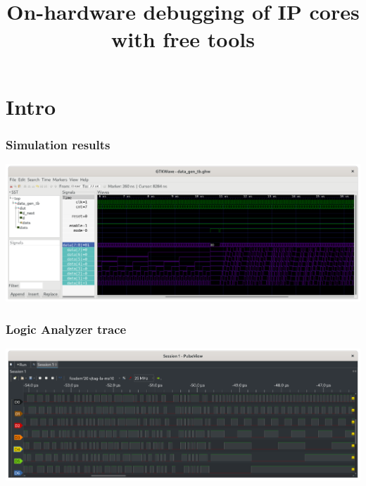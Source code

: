 
\usepackage{tikz}

\title{On-hardware debugging of IP cores with free tools}




\begin{frame}
  \titlepage
\end{frame}

\frame{\tableofcontents[subsectionstyle=show]}

\section{Intro}

\begin{frame}
  \frametitle{Simulation results}
  \includegraphics[width=\textwidth]{sim.png}
\end{frame}


\begin{frame}
  \frametitle{Logic Analyzer trace}
  \includegraphics[width=\textwidth]{pulseview.png}
\end{frame}





